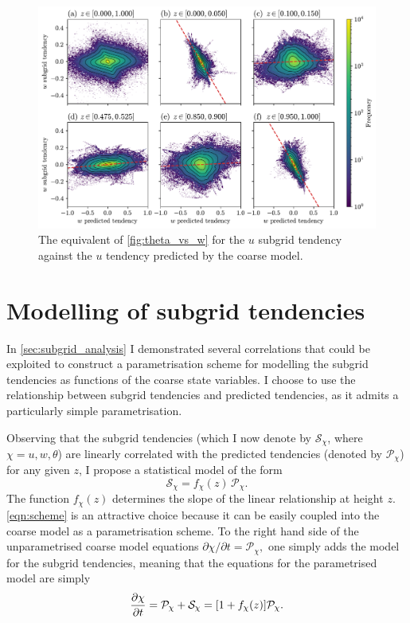 \documentclass[../main.tex]{subfiles}
\begin{document}
\begin{figure}[ht]
    \centering
    \includegraphics[width=0.95\linewidth]{figures/w_subgrid_vs_pred_tend.pdf}
    \caption{
        The equivalent of \cref{fig:theta_vs_w} for the $u$ subgrid
        tendency against the $u$ tendency predicted by the coarse model.
    }
    \label{fig:w_subgrid_vs_pred_tend}
\end{figure}


\section{Modelling of subgrid tendencies} \label{sec:subgrid_modelling}
In \cref{sec:subgrid_analysis} I demonstrated several correlations that could
be exploited to construct a parametrisation scheme for modelling the subgrid
tendencies as functions of the coarse state variables. I choose to use the
relationship between subgrid tendencies and predicted tendencies, as it admits
a particularly simple parametrisation.

Observing that the subgrid tendencies (which I now denote by
$\mathcal{S}_\chi$, where $\chi = u, w, \theta$) are linearly correlated with
the predicted tendencies (denoted by $\mathcal{P}_\chi$) for any given $z$, I
propose a statistical model of the form
\begin{equation} \label{eqn:scheme}
    \mathcal{S}_\chi =  f_\chi(z)\,\mathcal{P}_\chi.
\end{equation}
The function $f_\chi(z)$ determines the slope of the linear relationship at
height $z$. \cref{eqn:scheme} is an attractive choice because it can be easily
coupled into the coarse model as a parametrisation scheme. To the right hand
side of the unparametrised coarse model equations $\partial \chi/\partial t =
\mathcal{P}_\chi,$ one simply adds the model for the subgrid tendencies,
meaning that the equations for the parametrised model are simply
\begin{equation} \label{eqn:res_tend_parametrised_model}
    \frac{\partial \chi}{\partial t} = \mathcal{P}_\chi + \mathcal{S}_\chi
        = [1 + f_\chi(z)] \mathcal{P}_\chi.
\end{equation}
\end{document}

